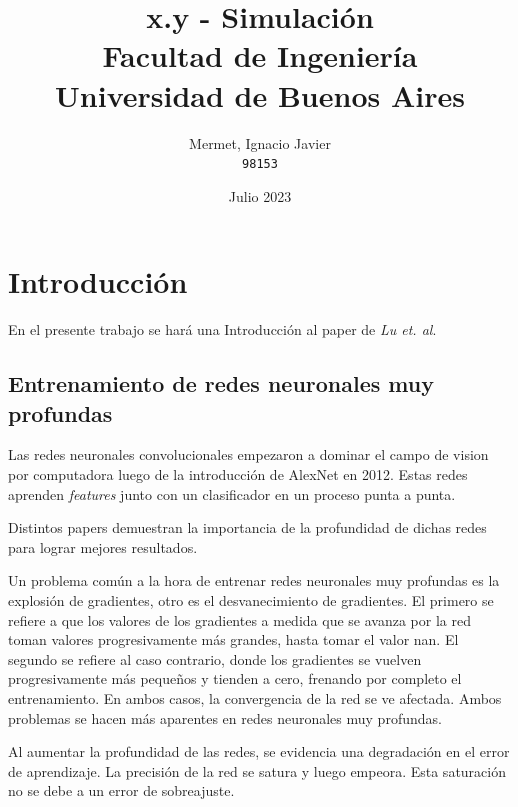 \documentclass[titlepage,a4paper,oneside]{article}
\begin{document}
\begin{titlepage}
\title{
	x.y \-- Simulación \\
    \large Facultad de Ingeniería\\
	Universidad de Buenos Aires
}
\author{
	Mermet, Ignacio Javier\\
	\texttt{98153}
}
\date{Julio 2023}

\maketitle

\end{titlepage}

\tableofcontents

\newpage

\section{Introducción}
En el presente trabajo se hará una Introducción al paper \cite{Beyond} de \textit{Lu et. al}.

\subsection{Entrenamiento de redes neuronales muy profundas}
Las redes neuronales convolucionales empezaron a dominar el campo de vision por computadora luego de la introducción de AlexNet \cite{AlexNet} en 2012. Estas redes aprenden \textit{features} junto con un clasificador en un proceso punta a punta.

Distintos papers demuestran la importancia de la profundidad de dichas redes para lograr mejores resultados.

Un problema común a la hora de entrenar redes neuronales muy profundas es la explosión de gradientes, otro es el desvanecimiento de gradientes. El primero se refiere a que los valores de los gradientes a medida que se avanza por la red toman valores progresivamente más grandes, hasta tomar el valor nan. El segundo se refiere al caso contrario, donde los gradientes se vuelven progresivamente más pequeños y tienden a cero, frenando por completo el entrenamiento. En ambos casos, la convergencia de la red se ve afectada. Ambos problemas se hacen más aparentes en redes neuronales muy profundas.

Al aumentar la profundidad de las redes, se evidencia una degradación en el error de aprendizaje. La precisión de la red se satura y luego empeora. Esta saturación no se debe a un error de sobreajuste.
\end{document}
